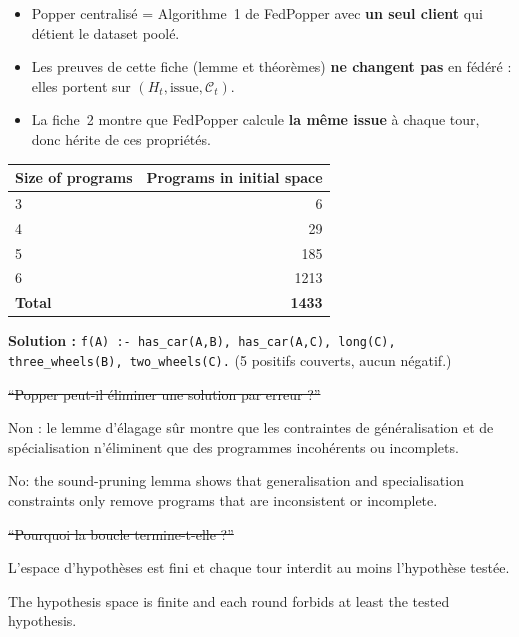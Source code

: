\documentclass[10pt]{article}
\begin{document}
\begin{itemize}
  \item Popper centralisé = Algorithme~1 de FedPopper avec \textbf{un seul client} qui détient le dataset poolé.
  \item Les preuves de cette fiche (lemme et théorèmes) \textbf{ne changent pas} en fédéré : elles portent sur $(H_t,\text{issue},\mathcal{C}_t)$.
  \item La fiche~2 montre que FedPopper calcule \textbf{la même issue} à chaque tour, donc hérite de ces propriétés.
\end{itemize}

\begin{tabular}{@{}l r@{}}
\textbf{Size of programs} & \textbf{Programs in initial space}\\\hline
3 & 6\\
4 & 29\\
5 & 185\\
6 & 1213\\
\textbf{Total} & \textbf{1433}\\
\end{tabular}
\textbf{Solution :} \texttt{f(A) :- has\_car(A,B), has\_car(A,C), long(C), three\_wheels(B), two\_wheels(C).}
(5 positifs couverts, aucun négatif.)


\st{``Popper peut-il éliminer une solution par erreur ?''}
\begin{dire}
Non : le lemme d'élagage sûr montre que les contraintes de généralisation et de spécialisation n'éliminent que des programmes incohérents ou incomplets.
\end{dire}
\begin{direEN}
No: the sound-pruning lemma shows that generalisation and specialisation constraints only remove programs that are inconsistent or incomplete.
\end{direEN}

\st{``Pourquoi la boucle termine-t-elle ?''}
\begin{dire}
L'espace d'hypothèses est fini et chaque tour interdit au moins l'hypothèse testée.
\end{dire}
\begin{direEN}
The hypothesis space is finite and each round forbids at least the tested hypothesis.
\end{direEN}
\end{document}
